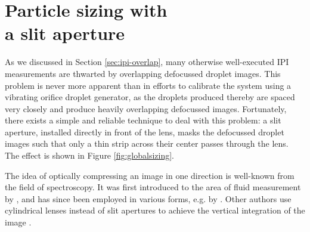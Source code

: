\documentclass[11.5pt]{book}
\begin{document}

\chapter[Particle sizing with a slit aperture]{Particle sizing with \\a slit aperture}
\label{chp:slit-aperture}
As we discussed in Section \ref{sec:ipi-overlap}, many otherwise well-executed IPI
measurements are thwarted by overlapping defocussed droplet images.
This problem is never more apparent than in efforts to calibrate
the system using a vibrating orifice droplet generator, as the droplets produced
thereby are spaced very closely and produce heavily overlapping defocussed
images. Fortunately, there exists a simple and reliable technique to deal with
this problem: a slit aperture, installed directly in front of the lens, masks
the defocussed droplet images such that only a thin strip across their center
passes through the lens. The effect is shown in Figure \ref{fig:globalsizing}. 

The idea of optically compressing an image in one direction is
well-known from the field of spectroscopy. It was first introduced to the area
of fluid measurement by \citet{Durst94}, and has since been employed in various
forms, e.g. by \citet{Pan06}. Other authors use cylindrical lenses instead
of slit apertures to achieve the vertical integration of the image
\cite{Kawaguchi02}.
\end{document}
